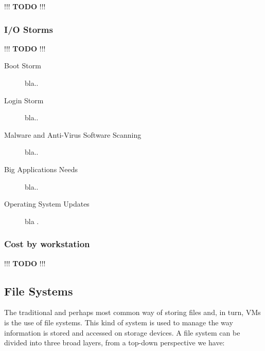 !!! \textbf{TODO} !!!

\subsubsection{I/O Storms}
\label{subsub:ios_storms}

!!! \textbf{TODO} !!!

\begin{description}
	\item [Boot Storm] bla..
	\item [Login Storm] bla..
	\item [Malware and Anti-Virus Software Scanning] bla..
	\item [Big Applications Needs] bla..
	\item [Operating System Updates] bla .
\end{description}


\subsubsection{Cost by workstation}
\label{subsub:cost_by_ws}

!!! \textbf{TODO} !!!
	 
	 


\subsection{File Systems} %
\label{sub:file_systems}

The traditional and perhaps most common way of storing files and, in turn, VMs is the use of file systems.
This kind of system is used to manage the way information is stored and accessed on storage devices. A file system can be divided into three broad layers, from a top-down perspective we have:

